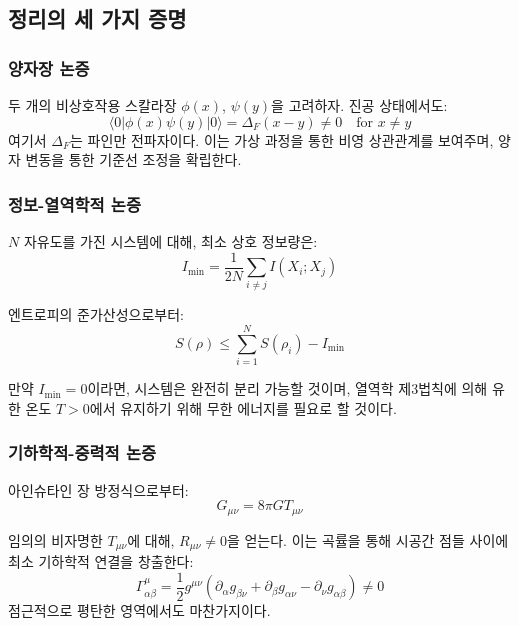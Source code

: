\documentclass[11pt,a4paper]{article}
\begin{document}
\subsection{정리의 세 가지 증명}

\subsubsection{양자장 논증}

두 개의 비상호작용 스칼라장 $\phi(x)$, $\psi(y)$을 고려하자. 진공 상태에서도:
\begin{equation}
	\langle 0 | \phi(x) \psi(y) | 0 \rangle = \Delta_F(x-y) \neq 0 \quad \text{for } x \neq y
\end{equation}
여기서 $\Delta_F$는 파인만 전파자이다. 이는 가상 과정을 통한 비영 상관관계를 보여주며, 양자 변동을 통한 기준선 조정을 확립한다.

\subsubsection{정보-열역학적 논증}

$N$ 자유도를 가진 시스템에 대해, 최소 상호 정보량은:
\begin{equation}
	I_{\min} = \frac{1}{2N} \sum_{i \neq j} I(X_i; X_j)
\end{equation}

엔트로피의 준가산성으로부터:
\begin{equation}
	S(\rho) \leq \sum_{i=1}^N S(\rho_i) - I_{\min}
\end{equation}

만약 $I_{\min} = 0$이라면, 시스템은 완전히 분리 가능할 것이며, 열역학 제3법칙에 의해 유한 온도 $T > 0$에서 유지하기 위해 무한 에너지를 필요로 할 것이다.

\subsubsection{기하학적-중력적 논증}

아인슈타인 장 방정식으로부터:
\begin{equation}
	G_{\mu\nu} = 8\pi G T_{\mu\nu}
\end{equation}

임의의 비자명한 $T_{\mu\nu}$에 대해, $R_{\mu\nu} \neq 0$을 얻는다. 이는 곡률을 통해 시공간 점들 사이에 최소 기하학적 연결을 창출한다:
\begin{equation}
	\Gamma^\mu_{\alpha\beta} = \frac{1}{2} g^{\mu\nu}(\partial_\alpha g_{\beta\nu} + \partial_\beta g_{\alpha\nu} - \partial_\nu g_{\alpha\beta}) \neq 0
\end{equation}
점근적으로 평탄한 영역에서도 마찬가지이다.
\end{document}
